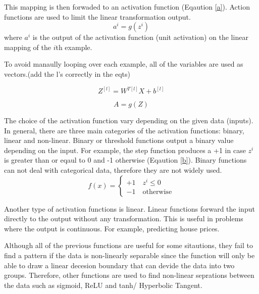 \documentclass[runningheads]{llncs}
\begin{document}
This mapping is then forwaded to an activation function (Eqaution \ref{a}).
Action functions are used to limit the linear transformation output.
\begin{equation}
    \label{a}
        a^i = g(z^i)
\end{equation}
where $a^i$ is the output of the activation function (unit activation) on the linear mapping of the $i$th example.

To avoid manaully looping over each example, all of the variables are used
as vectors.(add the l's correctly in the eqts)

\begin{equation}
    \label{zvec}
        Z^{[l]} = W^{T[l]}X + b^{[l]}
\end{equation}

\begin{equation}
    \label{zvec}
        A = g(Z)
\end{equation}

The choice of the activation function vary depending on the given data (inputs). 
In general, 
there are three main categories of the activation functions: binary, linear and non-linear. 
Binary or threshold functions output a binary value depending on the input. 
For example, the step function produces a +1 in case $z^i$ is greater than or eqaul to 0 and -1 otherwise (Eqaution \ref{b}).
Binary functions can not deal with categorical data, therefore they are not widely used.
\begin{equation}
    \label{b}
f(x) = \left\{ \begin{array}{ll} +1 \quad z^i \leq 0 \\ -1 \quad \text{otherwise} \end{array} \right.
\end{equation}

Another type of activation functions is linear. 
Linear functions forward the input directly to the output without any transformation.
This is useful in problems where the output is continuous. For example, predicting house prices.

Although all of the previous functions are useful for some sitautions, 
they fail to find a pattern if the data is non-linearly separable
since the function will only be able to draw a linear decesion boundary that can devide the data into two groups.
Therefore, other functions are used to find non-linear seprations between the data such as sigmoid, ReLU and tanh/ Hyperbolic Tangent. 
\end{document}

